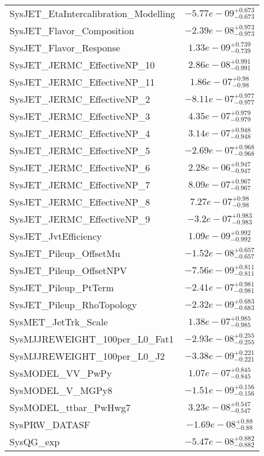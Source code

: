 \begin{tabular}{|l|c|}
SysJET\_EtaIntercalibration\_Modelling & $-5.77e-09^{+0.673}_{-0.673}$ \\
SysJET\_Flavor\_Composition & $-2.39e-08^{+0.973}_{-0.973}$ \\
SysJET\_Flavor\_Response & $1.33e-09^{+0.739}_{-0.739}$ \\
SysJET\_JERMC\_EffectiveNP\_10 & $2.86e-08^{+0.991}_{-0.991}$ \\
SysJET\_JERMC\_EffectiveNP\_11 & $1.86e-07^{+0.98}_{-0.98}$ \\
SysJET\_JERMC\_EffectiveNP\_2 & $-8.11e-07^{+0.977}_{-0.977}$ \\
SysJET\_JERMC\_EffectiveNP\_3 & $4.35e-07^{+0.979}_{-0.979}$ \\
SysJET\_JERMC\_EffectiveNP\_4 & $3.14e-07^{+0.948}_{-0.948}$ \\
SysJET\_JERMC\_EffectiveNP\_5 & $-2.69e-07^{+0.968}_{-0.968}$ \\
SysJET\_JERMC\_EffectiveNP\_6 & $2.28e-06^{+0.947}_{-0.947}$ \\
SysJET\_JERMC\_EffectiveNP\_7 & $8.09e-07^{+0.967}_{-0.967}$ \\
SysJET\_JERMC\_EffectiveNP\_8 & $7.27e-07^{+0.98}_{-0.98}$ \\
SysJET\_JERMC\_EffectiveNP\_9 & $-3.2e-07^{+0.983}_{-0.983}$ \\
SysJET\_JvtEfficiency & $1.09e-09^{+0.992}_{-0.992}$ \\
SysJET\_Pileup\_OffsetMu & $-1.52e-08^{+0.657}_{-0.657}$ \\
SysJET\_Pileup\_OffsetNPV & $-7.56e-09^{+0.811}_{-0.811}$ \\
SysJET\_Pileup\_PtTerm & $-2.41e-07^{+0.981}_{-0.981}$ \\
SysJET\_Pileup\_RhoTopology & $-2.32e-09^{+0.683}_{-0.683}$ \\
SysMET\_JetTrk\_Scale & $1.38e-07^{+0.985}_{-0.985}$ \\
SysMJJREWEIGHT\_100per\_L0\_Fat1 & $-2.93e-08^{+0.255}_{-0.255}$ \\
SysMJJREWEIGHT\_100per\_L0\_J2 & $-3.38e-09^{+0.221}_{-0.221}$ \\
SysMODEL\_VV\_PwPy & $1.07e-07^{+0.845}_{-0.845}$ \\
SysMODEL\_V\_MGPy8 & $-1.51e-09^{+0.156}_{-0.156}$ \\
SysMODEL\_ttbar\_PwHwg7 & $3.23e-08^{+0.547}_{-0.547}$ \\
SysPRW\_DATASF & $-1.69e-08^{+0.88}_{-0.88}$ \\
SysQG\_exp & $-5.47e-08^{+0.882}_{-0.882}$ \\

\end{tabular}
